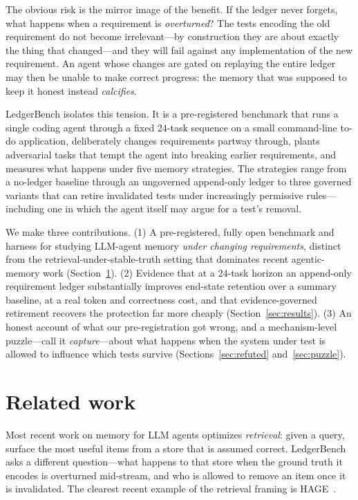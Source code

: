 \documentclass[11pt]{article}
\begin{document}
The obvious risk is the mirror image of the benefit. If the ledger never
forgets, what happens when a requirement is \emph{overturned}? The tests
encoding the old requirement do not become irrelevant---by construction they
are about exactly the thing that changed---and they will fail against any
implementation of the new requirement. An agent whose changes are gated on
replaying the entire ledger may then be unable to make correct progress: the
memory that was supposed to keep it honest instead \emph{calcifies}.

LedgerBench isolates this tension. It is a pre-registered benchmark that runs
a single coding agent through a fixed 24-task sequence on a small
command-line to-do application, deliberately changes requirements partway
through, plants adversarial tasks that tempt the agent into breaking earlier
requirements, and measures what happens under five memory strategies. The
strategies range from a no-ledger baseline through an ungoverned append-only
ledger to three governed variants that can retire invalidated tests under
increasingly permissive rules---including one in which the agent itself may
argue for a test's removal.

We make three contributions. (1) A pre-registered, fully open benchmark and
harness for studying LLM-agent memory \emph{under changing requirements},
distinct from the retrieval-under-stable-truth setting that dominates recent
agentic-memory work (Section~\ref{sec:related}). (2) Evidence that at a
24-task horizon an append-only requirement ledger substantially improves
end-state retention over a summary baseline, at a real token and correctness
cost, and that evidence-governed retirement recovers the protection far more
cheaply (Section~\ref{sec:results}). (3) An honest account of what our
pre-registration got wrong, and a mechanism-level puzzle---call it
\emph{capture}---about what happens when the system under test is allowed to
influence which tests survive (Sections~\ref{sec:refuted}
and~\ref{sec:puzzle}).

\section{Related work}
\label{sec:related}

Most recent work on memory for LLM agents optimizes \emph{retrieval}: given a
query, surface the most useful items from a store that is assumed correct.
LedgerBench asks a different question---what happens to that store when the
ground truth it encodes is overturned mid-stream, and who is allowed to
remove an item once it is invalidated. The clearest recent example of the
retrieval framing is HAGE~\cite{hage2026}.
\end{document}
